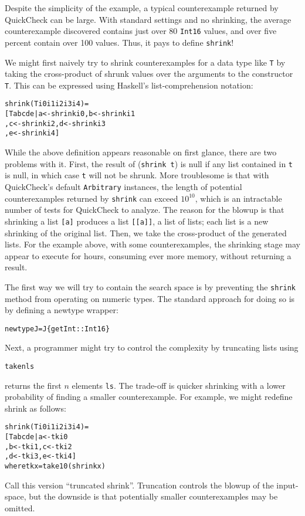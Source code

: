 \documentclass{sigplanconf}
\newenvironment{code}{\begin{alltt}\footnotesize}{\end{alltt}}
\newcommand{\ttp}[1]{\texttt{#1}}
\begin{document}
Despite the simplicity of the example, a typical counterexample returned by
QuickCheck can be large.  With standard settings and no shrinking, the average
counterexample discovered contains just over 80 \ttp{Int16} values, and over
five percent contain over 100 values.  Thus, it pays to define
\ttp{shrink}!

We might first naively try to shrink counterexamples for a data type like
\ttp{T} by taking the cross-product of shrunk values over the arguments to the
constructor \ttp{T}.  This can be expressed using Haskell's list-comprehension
notation:
%
\begin{code}
shrink (T i0 i1 i2 i3 i4) =
  [ T a b c d e | a <- shrink i0, b <- shrink i1
                , c <- shrink i2, d <- shrink i3
                , e <- shrink i4 ]
\end{code}
%
\noindent
While the above definition appears reasonable on first glance, there are two
problems with it.  First, the result of (\ttp{shrink t}) is null if any list
contained in \ttp{t} is null, in which case \ttp{t} will not be shrunk.  More
troublesome is that with QuickCheck's default \ttp{Arbitrary} instances, the
length of potential counterexamples returned by \ttp{shrink} can exceed
$10^{10}$, which is an intractable number of tests for QuickCheck to analyze.
The reason for the blowup is that shrinking a list \ttp{[a]} produces a list
\ttp{[[a]]}, a list of lists; each list is a new shrinking of the original list.
Then, we take the cross-product of the generated lists.  For the example above,
with some counterexamples, the shrinking stage may appear to execute for hours,
consuming ever more memory, without returning a result.

The first way we will try to contain the search space is by preventing the
\ttp{shrink} method from operating on numeric types.  The standard approach for
doing so is by defining a newtype wrapper:
%
\begin{code}
newtype J = J \{ getInt :: Int16 \}
\end{code}
%
\noindent
Next, a programmer might try to control the complexity by truncating lists using
%
\begin{code}
take n ls
\end{code}
%
returns the first $n$ elements \ttp{ls}.  The trade-off is quicker shrinking
with a lower probability of finding a smaller counterexample.  For example, we
might redefine shrink as follows:
%
\begin{samepage}
\begin{code}
shrink (T i0 i1 i2 i3 i4) =
  [ T a b c d e | a <- tk i0
                , b <- tk i1, c <- tk i2
                , d <- tk i3, e <- tk i4 ]
  where tk x = take 10 (shrink x)
\end{code}
\end{samepage}
%
\noindent
Call this version ``truncated shrink''.  Truncation controls the blowup of the
input-space, but the downside is that potentially smaller counterexamples may be
omitted.
\end{document}
